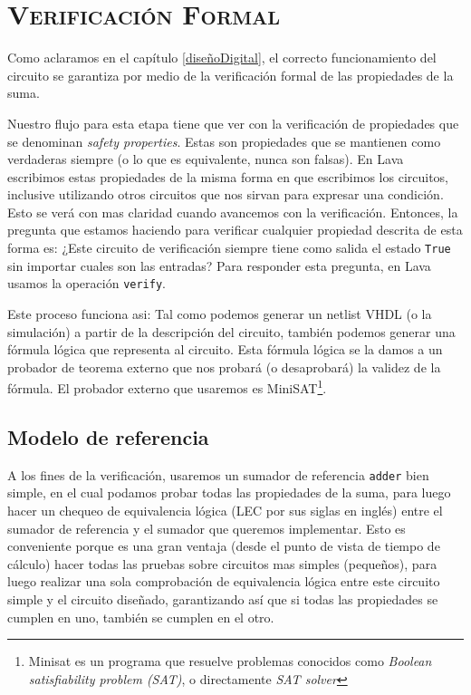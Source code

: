 

\chapter{ \textsc{ Verificación Formal } }\label{verificacion}

Como aclaramos en el capítulo \ref{diseñoDigital}, el correcto funcionamiento del circuito se garantiza por medio de la verificación formal de las propiedades de la suma. 

Nuestro flujo para esta etapa tiene que ver con la verificación de propiedades que se denominan \emph{safety properties}. Estas  son propiedades que se mantienen como verdaderas siempre (o lo que es equivalente, nunca son falsas). En Lava escribimos estas propiedades de la misma forma en que escribimos los circuitos, inclusive utilizando otros circuitos que nos sirvan para expresar una condición. Esto se verá con mas claridad cuando avancemos con la verificación. Entonces, la pregunta que estamos haciendo para verificar cualquier propiedad descrita de esta forma es:  ¿Este circuito de verificación siempre tiene como salida el estado \verb.True. sin importar cuales son las entradas? Para responder esta pregunta, en Lava usamos la operación \verb.verify..

Este proceso funciona asi: Tal como podemos generar un netlist VHDL (o la simulación) a partir de la descripción del circuito, también podemos generar una fórmula lógica que representa al circuito. Esta fórmula lógica se la damos a un probador de teorema externo que nos probará (o desaprobará) la validez de la fórmula. El probador externo que usaremos es MiniSAT\cite{minisat}\footnote{Minisat es un programa que resuelve problemas conocidos como \emph{Boolean satisfiability problem (SAT)}, o directamente \emph{SAT solver}}.

\section{Modelo de referencia}
A los fines de la verificación, usaremos un sumador de referencia \verb.adder. bien simple, en el cual podamos probar todas las propiedades de la suma, para luego hacer un chequeo de equivalencia lógica (LEC por sus siglas en inglés) entre el sumador de referencia y el sumador que queremos implementar. Esto es conveniente porque es una gran ventaja (desde el punto de vista de tiempo de cálculo) hacer todas las pruebas sobre circuitos mas simples (pequeños), para luego realizar una sola comprobación de equivalencia lógica entre este circuito simple y el circuito diseñado, garantizando así que si todas las propiedades se cumplen en uno, también se cumplen en el otro.


